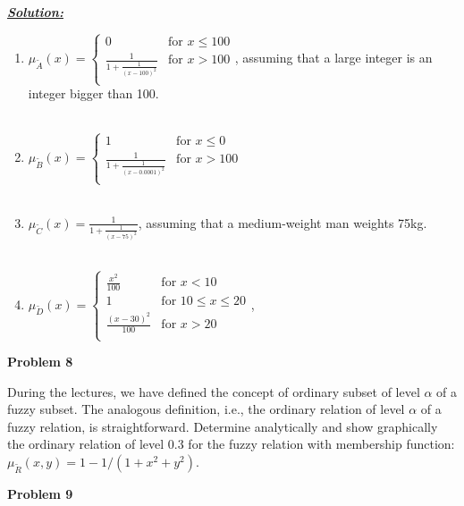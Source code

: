\documentclass{article}
\begin{document}
\noindent \underline{\textbf{\textit{Solution:}}}\\
\begin{enumerate} [label = \Alph*]
  \item $\mu_{\utilde{A}}(x) = \begin{cases}
    0 &\text{for } x \leq 100 \\
    \frac{1}{1+\frac{1}{(x-100)^2}} &\text{for } x>100\\
    
  \end{cases}$, assuming that a large integer is an integer bigger than 100.\\\\
  \item $\mu_{\utilde{B}}(x) = \begin{cases}
    1 &\text{for } x \leq 0 \\
    \frac{1}{1+\frac{1}{(x-0.0001)^2}} &\text{for } x>100\\
  \end{cases}$ \\ \\
  \item $\mu_{\utilde{C}}(x) = 
    \frac{1}{1+\frac{1}{(x-75)^2}}$, assuming that a medium-weight man weights 75kg.\\\\
  \item $\mu_{\utilde{D}}(x) = \begin{cases}
    \frac{x^2}{100} & \text{for } x<10 \\
    1 &\text{for } 10 \leq x \leq 20 \\
    \frac{(x-30)^2}{100} &\text{for } x>20\\
    
  \end{cases}$,
\end{enumerate}


\newpage
\noindent \textbf{Problem 8}

\noindent During the lectures, we have defined the concept of ordinary subset of level $\alpha$ of a fuzzy 
subset. The analogous definition, i.e., the ordinary relation of level $\alpha$ of a fuzzy relation, is 
straightforward. Determine analytically and show graphically the ordinary relation of level 
0.3 for the fuzzy relation with membership function: $\mu_{\utilde{R}}(x, y) = 1 - 1/(1+x^2+y^2)$.



\newpage
\noindent \textbf{Problem 9}
\end{document}
